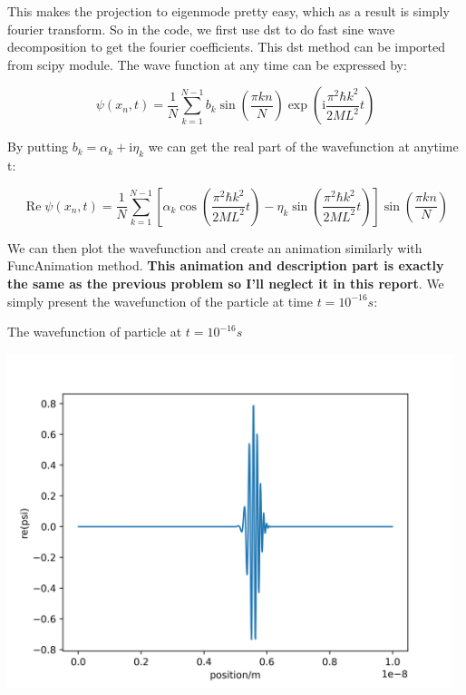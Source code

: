 \documentclass[letterpaper,12pt]{article}
\begin{document}
This makes the projection to eigenmode pretty easy, which as a result is simply fourier transform. So in the code, we first use dst to do fast sine wave decomposition to get the fourier coefficients. This dst method can be imported from scipy module. The wave function at any time can be expressed by:

\begin{equation}
    \psi\left(x_n, t\right)=\frac{1}{N} \sum_{k=1}^{N-1} b_k \sin \left(\frac{\pi k n}{N}\right) \exp \left(\mathrm{i} \frac{\pi^2 \hbar k^2}{2 M L^2} t\right)
\end{equation}

By putting $b_k=\alpha_k+\mathrm{i} \eta_k$ we can get the real part of the wavefunction at anytime t:

\begin{equation}
    \operatorname{Re} \psi\left(x_n, t\right)=\frac{1}{N} \sum_{k=1}^{N-1}\left[\alpha_k \cos \left(\frac{\pi^2 \hbar k^2}{2 M L^2} t\right)-\eta_k \sin \left(\frac{\pi^2 \hbar k^2}{2 M L^2} t\right)\right] \sin \left(\frac{\pi k n}{N}\right)
\end{equation}

We can then plot the wavefunction and create an animation similarly with FuncAnimation method. \textbf{This animation and description part is exactly the same as the previous problem so I'll neglect it in this report}. We simply present the wavefunction of the particle at time $t = 10^{-16}s$:

\begin{table}[!h]
    \centering
    \caption{The wavefunction of particle at $t = 10^{-16}s$}
    \includegraphics[width=13cm]{7.png}
\end{table}%
\end{document}
